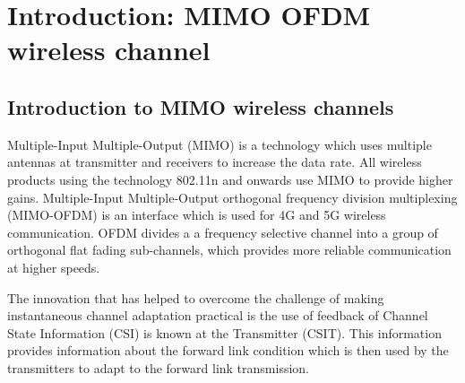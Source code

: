 \documentclass[11pt,a4paper]{report}
\newif\ifpdf
\begin{document}


% 



\newpage
{} %
\tableofcontents
\newpage



\pagestyle{fancy}
\fancyhead[LE]{\leftmark}
\fancyhead[LO]{}
\fancyhead[RO]{\rightmark}
\fancyhead[RE]{}
\fancyfoot[C]{\thepage}
\renewcommand{\headrulewidth}{0.1pt}
\renewcommand{\footrulewidth}{0pt}

\renewcommand{\sectionmark}[1]{%
\markright{\it \thesection \ #1}{}}

\renewcommand{\chaptermark}[1]{%
\markboth{\it \chaptername \ \thechapter.\ #1}{}}

\chapter{Introduction: MIMO OFDM wireless channel}
\label{chap:intro}

\section{Introduction to MIMO wireless channels}
Multiple-Input Multiple-Output (MIMO) is a technology which uses multiple antennas 
at transmitter and receivers to increase the data rate. All wireless products using 
the technology 802.11n and onwards use MIMO to provide higher gains.
Multiple-Input Multiple-Output orthogonal frequency division multiplexing (MIMO-OFDM)
is an interface which is used for 4G and 5G wireless communication. OFDM divides a 
a frequency selective channel into a group of orthogonal flat fading sub-channels, which
provides more reliable communication at higher speeds. 

The innovation that has helped to overcome the challenge of making instantaneous
channel adaptation practical is the use of feedback of Channel State Information 
(CSI) is known at the Transmitter (CSIT). This information provides information
about the forward link condition which is then used by the transmitters to 
adapt to the forward link transmission.
\end{document}
